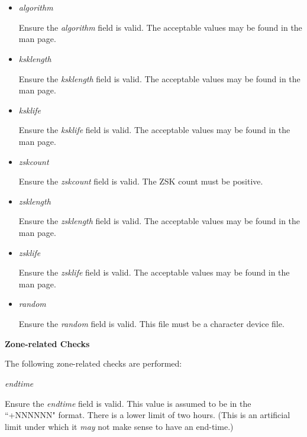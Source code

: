 \begin{itemize}

\item {\it algorithm}\verb" "

Ensure the {\it algorithm} field is valid.  The acceptable values may be found
in the  man page.

\item {\it ksklength}\verb" "

Ensure the {\it ksklength} field is valid.  The acceptable values may be found
in the  man page.

\item {\it ksklife}\verb" "

Ensure the {\it ksklife} field is valid.  The acceptable values may be found
in the  man page.

\item {\it zskcount}\verb" "

Ensure the {\it zskcount} field is valid.  The ZSK count must be positive.

\item {\it zsklength}\verb" "

Ensure the {\it zsklength} field is valid.  The acceptable values may be found
in the  man page.

\item {\it zsklife}\verb" "

Ensure the {\it zsklife} field is valid.  The acceptable values may be found
in the  man page.

\item {\it random}\verb" "

Ensure the {\it random} field is valid.  This file must be a character
device file.

\end{itemize}

{\bf Zone-related Checks}

The following zone-related checks are performed:

\begin{description}

\item {\it endtime}\verb" "

Ensure the {\it endtime} field is valid.  This value is assumed to be in the
``+NNNNNN" format.  There is a lower limit of two hours.  (This is an
artificial limit under which it {\it may} not make sense to have an end-time.)

\end{description}


